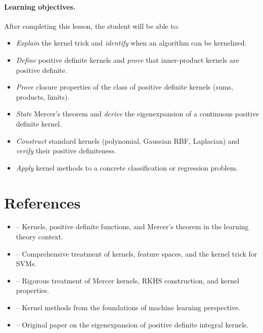 \documentclass[11pt,a4paper]{article}
\begin{document}
\paragraph{Learning objectives.}
After completing this lesson, the student will be able to:
\begin{itemize}
    \item \emph{Explain} the kernel trick and \emph{identify} when
    an algorithm can be kernelized.
    \item \emph{Define} positive definite kernels and \emph{prove}
    that inner-product kernels are positive definite.
    \item \emph{Prove} closure properties of the class of positive
    definite kernels (sums, products, limits).
    \item \emph{State} Mercer's theorem and \emph{derive} the
    eigenexpansion of a continuous positive definite kernel.
    \item \emph{Construct} standard kernels (polynomial, Gaussian
    RBF, Laplacian) and \emph{verify} their positive definiteness.
    \item \emph{Apply} kernel methods to a concrete classification
    or regression problem.
\end{itemize}


\section{References}
\label{sec:references}

\begin{itemize}
    \item \citet[Chapter 4]{bach2024} -- Kernels, positive definite
    functions, and Mercer's theorem in the learning theory context.
    \item \citet[Chapters 2--3]{scholkopf2002} -- Comprehensive
    treatment of kernels, feature spaces, and the kernel trick for
    SVMs.
    \item \citet[Chapters 5--6]{steinwart2008} -- Rigorous treatment
    of Mercer kernels, RKHS construction, and kernel properties.
    \item \citet[Chapter 6]{mohri2018} -- Kernel methods from the
    foundations of machine learning perspective.
    \item \citet{mercer1909} -- Original paper on the eigenexpansion
    of positive definite integral kernels.
\end{itemize}
\end{document}

